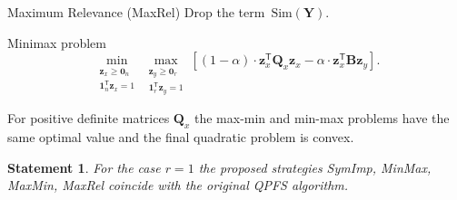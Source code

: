 \documentclass[9pt]{beamer}
\newcommand{\bz}{\mathbf{z}}
\newcommand{\bY}{\mathbf{Y}}
\newcommand{\bB}{\mathbf{B}}
\newcommand{\bQ}{\mathbf{Q}}
\newcommand{\bOne}{\boldsymbol{1}}
\newcommand{\bZero}{\boldsymbol{0}}
\newcommand{\T}{\mathsf{T}}
\newtheorem{statement}{Statement}
\begin{document}
\begin{frame}{Maximum Relevance (MaxRel)}
	Drop the term~$\text{Sim}(\bY)$. 
	\begin{block}{Minimax problem}
	\[
		\min_{\substack{\bz_x \geq \bZero_n \\ \bOne_n^{\T}\bz_x=1}} 	\max_{\substack{\bz_y \geq \bZero_r \\ \bOne_r^{\T}\bz_y=1}} \left[ (1 - \alpha) \cdot \bz_x^{\T} \bQ_x \bz_x - \alpha \cdot \bz_x^{\T} \bB \bz_y \right].
	\]
	\end{block}
	\begin{theorem}
		For positive definite matrices $\bQ_x$ the max-min and min-max problems have the same optimal value and the final quadratic problem is convex. 
	\end{theorem}
\begin{statement}
	For the case $r=1$ the proposed strategies SymImp, MinMax, MaxMin, MaxRel coincide with the original QPFS algorithm.
\end{statement}
\end{frame}
\end{document}
